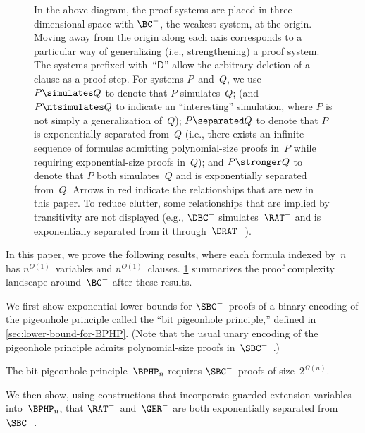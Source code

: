 \documentclass[12pt]{article}
\begin{document}
\begin{figure}[!ht]
  \caption{In the above diagram, the proof systems are placed in
    three-dimensional space with $\BC^-$, the weakest system, at the origin.
    Moving away from the origin along each axis
    corresponds to a particular way of generalizing
    (i.e., strengthening) a proof system.
    The systems prefixed with~``$\mathsf{D}$'' allow
    the arbitrary deletion of a clause as a proof step.
    For systems $P$~and~$Q$, we use
    $P \simulates Q$ to denote that $P$ simulates~$Q$;
    (and $P \ntsimulates Q$ to indicate an ``interesting'' simulation,
    where $P$ is not simply a generalization of~$Q$);
    $P \separated Q$ to denote that $P$ is exponentially separated from~$Q$
    (i.e., there exists an infinite sequence of formulas
    admitting polynomial-size proofs in~$P$
    while requiring exponential-size proofs in~$Q$);
    and $P \stronger Q$ to denote that $P$ both simulates~$Q$
    and is exponentially separated from~$Q$.
    Arrows in \textcolor{customred}{red}
    indicate the relationships that are new in this paper.
    To reduce clutter, some relationships that are implied by transitivity
    are not displayed (e.g., $\DBC^-$ simulates~$\RAT^-$
    and is exponentially separated from it through~$\DRAT^-$).}
  \label{fig:redundancy-landscape}
\end{figure}

In this paper, we prove the following results, where each formula indexed by~$n$
has $n^{O(1)}$~variables and $n^{O(1)}$~clauses.
\cref{fig:redundancy-landscape} summarizes
the proof complexity landscape around~$\BC^-$ after these results.

We first show exponential lower bounds for $\SBC^-$~proofs
of a binary encoding of the pigeonhole principle
called the ``bit pigeonhole principle,''
defined in \cref{sec:lower-bound-for-BPHP}.
(Note that the usual unary encoding of the pigeonhole principle
admits polynomial-size proofs in~$\SBC^-$~\cite[Lemma~7.1]{YH23}.)

\begin{theorem}\label{thm:SBC-lower-bound}
  The bit pigeonhole principle~$\BPHP_n$
  requires $\SBC^-$~proofs of size~$2^{\Omega(n)}$.
\end{theorem}

We then show, using constructions that incorporate
guarded extension variables into~$\BPHP_n$,
that $\RAT^-$~and~$\GER^-$ are both exponentially separated from~$\SBC^-$.
\end{document}
